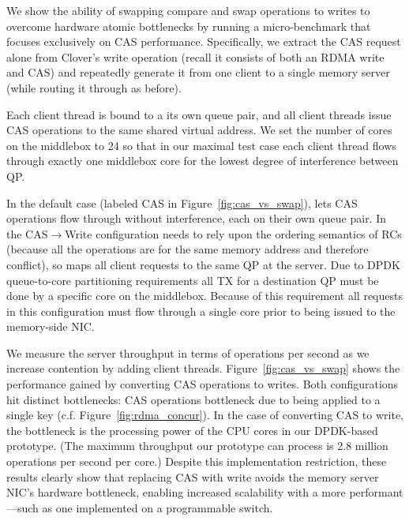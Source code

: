We show the ability of swapping compare and swap operations to writes
to overcome hardware atomic bottlenecks by running a micro-benchmark
that focuses exclusively on CAS performance.  Specifically, we extract
the CAS request alone from Clover's write operation (recall it
consists of both an RDMA write and CAS) and repeatedly generate it
from one client to a single memory server (while routing it through
{\sword} as before).


Each client thread is bound to a its own queue pair, and all client
threads issue CAS operations to the same shared virtual address.  We
set the number of cores on the {\sword} middlebox to 24 so that in our maximal
test case each client thread flows through exactly one middlebox core
for the lowest degree of interference between QP.

In the default case (labeled CAS in Figure~\ref{fig:cas_vs_swap}),
{\sword} lets CAS operations flow through without interference, each
on their own queue pair.  In the CAS$\rightarrow$Write configuration
{\sword} needs to rely upon the ordering semantics of RCs (because all
the operations are for the same memory address and therefore
conflict), so maps all client requests to the same QP at the server.
Due to DPDK queue-to-core partitioning requirements all TX for a
destination QP must be done by a specific core on the
middlebox. Because of this requirement all requests in this
configuration must flow through a single core prior to being issued to
the memory-side NIC.


We measure the server throughput in terms of operations per second as
we increase contention by adding client threads.
Figure~\ref{fig:cas_vs_swap} shows the performance gained by
converting CAS operations to writes. Both configurations hit distinct
bottlenecks: CAS operations bottleneck due to being applied to a
single key (c.f. Figure~\ref{fig:rdma_concur}). In the case of
converting CAS to write, the bottleneck is the processing power of the
CPU cores in our DPDK-based {\sword} prototype. (The maximum throughput
our prototype can process is 2.8 million operations per second per
core.)
Despite this implementation restriction, these results clearly show that
replacing CAS with write avoids the memory server NIC's hardware
bottleneck, enabling increased scalability with a more performant
{\sword}---such as one implemented on a programmable switch.
